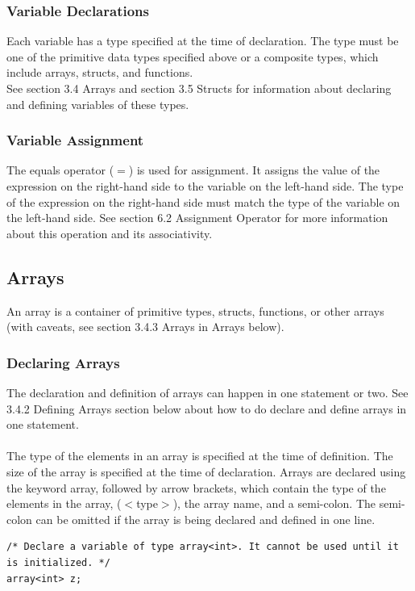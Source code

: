 \documentclass[12pt]{article}
\begin{document}
\subsubsection{Variable Declarations}
Each variable has a type specified at the time of declaration. The type must be one of the primitive data types specified above or a composite types, which include arrays, structs, and functions.\\
 
See section 3.4 Arrays and section 3.5 Structs for information about declaring and defining variables of these types.

\subsubsection{Variable Assignment}
The equals operator ($=$) is used for assignment. It assigns the value of the expression on the right-hand side to the variable on the left-hand side. The type of the expression on the right-hand side must match the type of the variable on the left-hand side. See section 6.2 Assignment Operator for more information about this operation and its associativity.

\subsection{Arrays}
An array is a container of primitive types, structs, functions, or other arrays (with caveats, see section 3.4.3 Arrays in Arrays below).

\subsubsection{Declaring Arrays}
The declaration and definition of arrays can happen in one statement or two. See 3.4.2 Defining Arrays section below about how to do declare and define arrays in one statement. \\
\\
The type of the elements in an array is specified at the time of definition. The size of the array is specified at the time of declaration. Arrays are declared using the keyword array, followed by arrow brackets, which contain the type of the elements in the array, ($<$type$>$), the array name, and a semi-colon. The semi-colon can be omitted if the array is being declared and defined in one line.
\begin{lstlisting}
/* Declare a variable of type array<int>. It cannot be used until it is initialized. */
array<int> z; 
\end{lstlisting}
\end{document}
